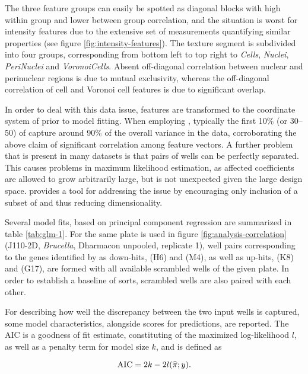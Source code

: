 The three feature groups can easily be spotted as diagonal blocks with high within group and lower between group correlation, and the situation is worst for intensity features due to the extensive set of measurements quantifying similar properties (see figure \ref{fig:intensity-features}). The texture segment is subdivided into four groups, corresponding from bottom left to top right to \textit{Cells}, \textit{Nuclei}, \textit{PeriNuclei} and \textit{VoronoiCells}. Absent off-diagonal correlation between nuclear and perinuclear regions is due to mutual exclusivity, whereas the off-diagonal correlation of cell and Voronoi cell features is due to significant overlap.



In order to deal with this data issue, features are transformed to the coordinate system of  prior to  model fitting. When employing , typically the first 10\% (or 30--50) of  capture around 90\% of the overall variance in the data, corroborating the above claim of significant correlation among feature vectors. A further problem that is present in many datasets is that pairs of wells can be perfectly separated. This causes problems in maximum likelihood estimation, as affected coefficients are allowed to grow arbitrarily large, but is not unexpected given the large design space.  provides a tool for addressing the issue by encouraging only inclusion of a subset of  and thus reducing dimensionality.

Several  model fits, based on principal component regression are summarized in table \ref{tab:glm-1}. For the same plate is used in figure \ref{fig:analysis-correlation} (J110-2D, \textit{Brucella}, Dharmacon unpooled, replicate 1), well pairs corresponding to the genes identified by  as down-hits,  (H6) and  (M4), as well as up-hits,  (K8) and  (G17), are formed with all available scrambled wells of the given plate. In order to establish a baseline of sorts, scrambled wells are also paired with each other.

For describing how well the discrepancy between the two input wells is captured, some model characteristics, alongside scores for predictions, are reported. The AIC is a goodness of fit estimate, constituting of the maximized log-likelihood $l$, as well as a penalty term for model size $k$, and is defined as

\begin{equation}
  \operatorname{AIC} = 2k - 2l(\widehat{\pi}; y).
\end{equation}

